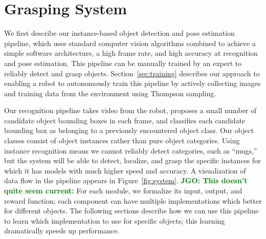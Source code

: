 \documentclass{article}
\newcommand{\jgonote}[1]{\textcolor{green}{\textbf{JGO: #1}}}
\begin{document}


\section{Grasping System}

We first describe our instance-based object detection and pose
estimation pipeline, which uses standard computer vision algorithms
combined to achieve a simple software architecture, a high frame rate,
and high accuracy at recognition and pose estimation.  This pipeline
can be manually trained by an expert to reliably detect and grasp
objects.  Section~\ref{sec:training} describes our approach to
enabling a robot to autonomously train this pipeline by actively
collecting images and training data from the environment using
Thompson sampling.

Our recognition pipeline takes video from the robot, proposes a small
number of candidate object bounding boxes in each frame, and
classifies each candidate bounding box as belonging to a previously
encountered object class. Our object classes consist of object
instances rather than pure object categories.  Using instance
recognition means we cannot reliably detect categories, such as
``mugs,'' but the system will be able to detect, localize, and grasp
the specific instances for which it has models with much higher speed
and accuracy.  A visualization of data flow in the pipeline appears in
Figure~\ref{fig:system}.  \jgonote{This doesn't quite seem current:}
For each module, we formalize its input,
output, and reward function; each component can have multiple
implementations which better for different objects.  The following
sections describe how we can use this pipeline to learn which
implementation to use for specific objects; this learning dramatically
speeds up performance.

\end{document}
